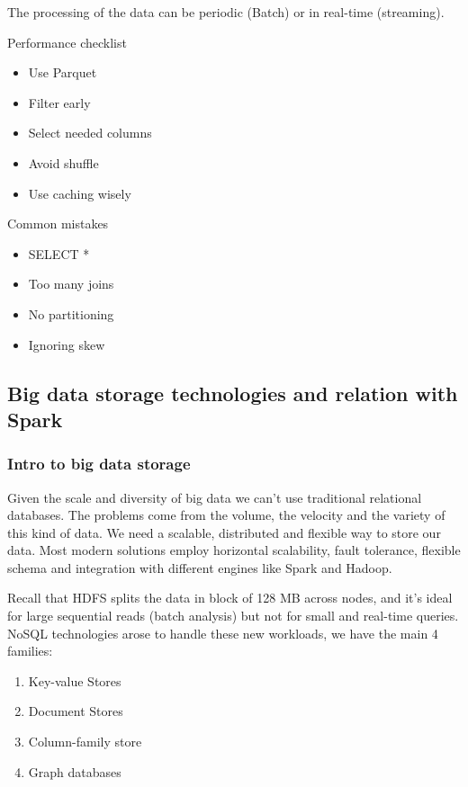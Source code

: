 The processing of the data can be periodic (Batch) or in real-time (streaming).

\vspace{10pt}

Performance checklist

\begin{itemize}
    \item Use Parquet
    \item Filter early
    \item Select needed columns
    \item Avoid shuffle
    \item Use caching wisely
\end{itemize}

Common mistakes

\begin{itemize}
    \item SELECT *
    \item Too many joins
    \item No partitioning
    \item Ignoring skew
\end{itemize}


\subsection{Big data storage technologies and relation with Spark}


\subsubsection{Intro to big data storage}

Given the scale and diversity of big data we can't use traditional relational databases. The problems come from the volume, the velocity and the variety of this kind of data. We need a scalable, distributed and flexible way to store our data. Most modern solutions employ horizontal scalability, fault tolerance, flexible schema and integration with different engines like Spark and Hadoop. 

\vspace{10pt}

Recall that HDFS splits the data in block of 128 MB across nodes, and it's ideal for large sequential reads (batch analysis) but not for small and real-time queries. NoSQL technologies arose to handle these new workloads, we have the main 4 families:

\begin{enumerate}
    \item Key-value Stores
    \item Document Stores
    \item Column-family store
    \item Graph databases
\end{enumerate}

